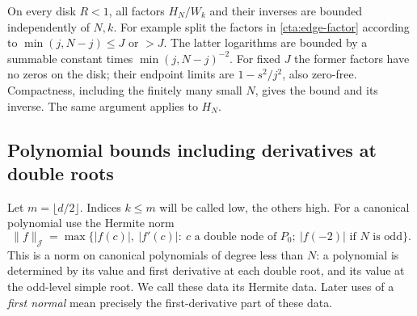 On every disk \(R<1\), all factors \(H_N/W_k\) and their inverses
are bounded independently of \(N,k\). For example split the factors
in \eqref{cta:edge-factor} according to
\(\min(j,N-j)\le J\) or \(>J\). The latter logarithms are bounded
by a summable constant times \(\min(j,N-j)^{-2}\).
For fixed \(J\) the former factors have no zeros on the disk;
their endpoint limits are \(1-s^2/j^2\), also zero-free.
Compactness, including the finitely many small \(N\), gives the
bound and its inverse. The same argument applies to \(H_N\).

\subsection{Polynomial bounds including derivatives at double roots}
Let \(m=\lfloor d/2\rfloor\). Indices \(k\le m\) will be called
low, the others high. For a canonical polynomial use the Hermite
norm
\[
 \|f\|_{\mathcal J}=
 \max\{|f(c)|,\ |f'(c)|:\ c\text{ a double node of }P_0;
                 \ |f(-2)|\text{ if }N\text{ is odd}\}.
\]
This is a norm on canonical polynomials of degree less than $N$: a
polynomial is determined by its value and first derivative at each
double root, and its value at the odd-level simple root. We call these
data its Hermite data. Later uses of a \emph{first normal} mean precisely
the first-derivative part of these data.

